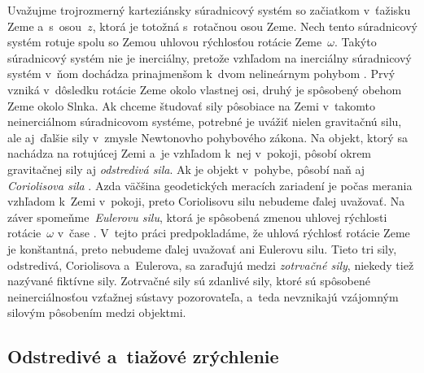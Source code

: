 \documentclass[a4paper,12pt]{book}
\begin{document}
Uvažujme trojrozmerný karteziánsky súradnicový systém so začiatkom v~ťažisku 
Zeme a~s~osou~$z$, ktorá je totožná s~rotačnou osou Zeme.  Nech tento 
súradnicový systém rotuje spolu so Zemou uhlovou rýchlosťou rotácie 
Zeme~$\omega$.  Takýto súradnicový systém nie je inerciálny, pretože vzhľadom 
na inerciálny súradnicový systém v~ňom dochádza prinajmenšom k~dvom nelineárnym 
pohybom \parencite{SansoGeoidDetermination}.  Prvý vzniká v~dôsledku rotácie 
Zeme okolo vlastnej osi, druhý je spôsobený obehom Zeme okolo Slnka.  Ak chceme 
študovať sily pôsobiace na Zemi v~takomto neinerciálnom súradnicovom systéme, 
potrebné je uvážiť nielen gravitačnú silu, ale aj~ďalšie sily v~zmysle 
Newtonovho pohybového zákona.  Na objekt, ktorý sa nachádza na rotujúcej Zemi 
a~je vzhľadom k~nej v~pokoji, pôsobí okrem gravitačnej sily aj \emph{odstredivá 
sila}.  Ak je objekt v~pohybe, pôsobí naň aj \emph{Coriolisova sila} 
\parencite{Torge1989,Jekeli2000,SansoGeoidDetermination}.  Azda väčšina 
geodetických meracích zariadení je počas merania vzhľadom k~Zemi v~pokoji, 
preto Coriolisovu silu nebudeme ďalej uvažovať.  Na záver 
spomeňme~\emph{Eulerovu silu}, ktorá je spôsobená zmenou uhlovej rýchlosti 
rotácie~$\omega$ v~čase \parencite{Torge1989,SansoGeoidDetermination}.  V~tejto 
práci predpokladáme, že uhlová rýchlosť rotácie Zeme je konštantná, preto 
nebudeme ďalej uvažovať ani Eulerovu silu.  Tieto tri sily, odstredivá, 
Coriolisova a~Eulerova, sa zaraďujú medzi \emph{zotrvačné sily}, niekedy tiež 
nazývané fiktívne sily.  Zotrvačné sily sú zdanlivé sily, ktoré sú spôsobené 
neinerciálnosťou vzťažnej sústavy pozorovateľa, a~teda nevznikajú vzájomným 
silovým pôsobením medzi objektmi.






\subsection{Odstredivé a~tiažové zrýchlenie}
\label{sec:centrifugal_and_gravity_acceleration}
\end{document}
